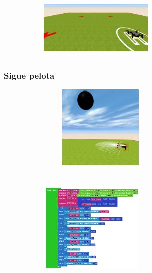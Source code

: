\documentclass[xcolor={table}]{beamer}
\begin{document}
\begin{frame}
\begin{figure}[ht]
\begin{subfigure}{\textwidth}
        \label{fig:chocagira}
        \end{subfigure}\hfill
        \begin{subfigure}{\textwidth}
            \includegraphics[width=5.5cm, height=3cm]{img/cuadradoDrone.png}
        \label{fig:cuadrado}
        \end{subfigure}
            \label{fig:ejercicios}
            \end{figure}
         \end{frame}
		

		\begin{frame}
			\frametitle{Sigue pelota}

        \begin{figure}[H]
        \centering
        \begin{subfigure}{\textwidth}
            \includegraphics[width=6cm, height=4cm]{img/followBallTello12.png}
        \label{fig:followBall}
        \end{subfigure}\hfill
        \begin{subfigure}{\textwidth}
            \includegraphics[width=5cm, height=5.5cm]{img/siguepelotacodigo.png}
        \label{fig:siguepelotacodigo}
        \end{subfigure}\hfill
        \label{fig:siguepelota}
        \end{figure}
 		\end{frame}
\end{document}

